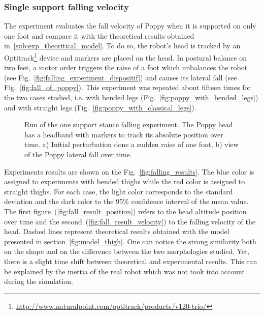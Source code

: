 \subsubsection{Single support falling velocity} %
\label{ssub:falling_velocity}
The experiment evaluates the fall velocity of Poppy when it is supported on only one foot and compare it with the theoretical results obtained in~\ref{sub:exp_theoritical_model}. To do so, the robot's head is tracked by an Optitrack\footnote{\url{http://www.naturalpoint.com/optitrack/products/v120-trio/}} device and markers are placed on the head. In postural balance on two feet, a motor order triggers the raise of a foot which unbalances the robot (see Fig.~\ref{fig:falling_experiment_dispositif}) and causes its lateral fall (see Fig.~\ref{fig:fall_of_poppy}). This experiment was repeated about fifteen times for the two cases studied, i.e. with bended legs (Fig.~\ref{fig:poppy_with_bended_legs}) and with straight legs (Fig.~\ref{fig:poppy_with_classical_legs}).

\begin{figure}[h]
\centering
    \hfil
    \caption{Run of the one support stance falling experiment.
    The Poppy head has a headband with markers to track its absolute position over time.
     a) Initial perturbation done a sudden raise of one foot, b) view of the Poppy lateral fall over time.}
    \label{fig:falling_experiment}
\end{figure}

Experiments results are shown on the Fig.~\ref{fig:falling_results}. The blue color is assigned to experiments with bended thighs while the red color is assigned to straight thighs. For each case, the light color corresponds to the standard deviation and the dark color to the 95\% confidence interval of the mean value. The first figure~(\ref{fig:fall_result_position}) refers to the head altitude position over time and the second~(\ref{fig:fall_result_velocity}) to the falling velocity of the head. Dashed lines represent theoretical results obtained with the model presented in section~\ref{fig:model_thigh}. One can notice the strong similarity both on the shape and on the difference between the two morphologies studied. Yet, there is a slight time shift between theoretical and experimental results. This can be explained by the inertia of the real robot which was not took into account during the simulation.

